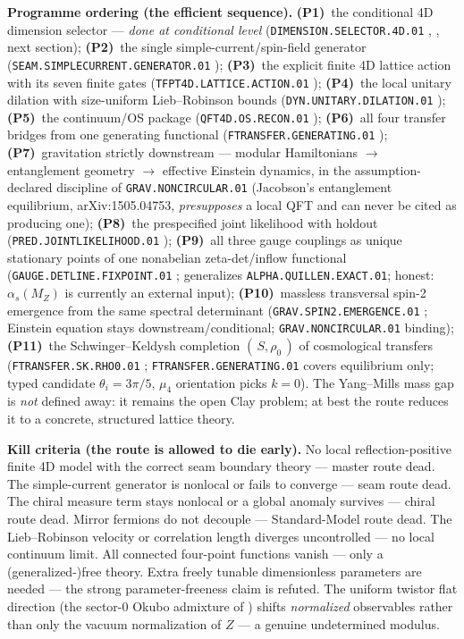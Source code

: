 \par\smallskip\noindent\textbf{Programme ordering (the efficient sequence).}
\textbf{(P1)}~the conditional 4D dimension selector --- \emph{done at conditional level}
(\texttt{DIMENSION.SELECTOR.4D.01} \mC, , next section);
\textbf{(P2)}~the single simple-current/spin-field generator
(\texttt{SEAM.SIMPLECURRENT.GENERATOR.01} \mO);
\textbf{(P3)}~the explicit finite 4D lattice action with its seven finite gates
(\texttt{TFPT4D.LATTICE.ACTION.01} \mO);
\textbf{(P4)}~the local unitary dilation with size-uniform Lieb--Robinson bounds
(\texttt{DYN.UNITARY.DILATION.01} \mO);
\textbf{(P5)}~the continuum/OS package (\texttt{QFT4D.OS.RECON.01} \mO);
\textbf{(P6)}~all four transfer bridges from one generating functional
(\texttt{FTRANSFER.GENERATING.01} \mO);
\textbf{(P7)}~gravitation strictly downstream --- modular Hamiltonians $\to$ entanglement
geometry $\to$ effective Einstein dynamics, in the assumption-declared discipline of
\texttt{GRAV.NONCIRCULAR.01} (Jacobson's entanglement equilibrium, arXiv:1505.04753,
\emph{presupposes} a local QFT and can never be cited as producing one);
\textbf{(P8)}~the prespecified joint likelihood with holdout
(\texttt{PRED.JOINTLIKELIHOOD.01} \mO);
\textbf{(P9)}~all three gauge couplings as unique stationary points of one nonabelian
zeta-det/inflow functional (\texttt{GAUGE.DETLINE.FIXPOINT.01} \mO; generalizes
\texttt{ALPHA.QUILLEN.EXACT.01}; honest: $\alpha_s(M_Z)$ is currently an external input);
\textbf{(P10)}~massless transversal spin-2 emergence from the same spectral determinant
(\texttt{GRAV.SPIN2.EMERGENCE.01} \mO; Einstein equation stays downstream/conditional;
\texttt{GRAV.NONCIRCULAR.01} binding);
\textbf{(P11)}~the Schwinger--Keldysh completion $(\,S,\rho_0\,)$ of cosmological transfers
(\texttt{FTRANSFER.SK.RHO0.01} \mO; \texttt{FTRANSFER.GENERATING.01} covers equilibrium only;
typed candidate $\theta_i=3\pi/5$, $\mu_4$ orientation picks $k=0$).
The Yang--Mills mass gap is \emph{not} defined away: it remains the open Clay problem; at best
the route reduces it to a concrete, structured lattice theory.

\par\smallskip\noindent\textbf{Kill criteria (the route is allowed to die early).}
No local reflection-positive finite 4D model with the correct seam boundary theory --- master
route dead.  The simple-current generator is nonlocal or fails to converge --- seam route dead.
The chiral measure term stays nonlocal or a global anomaly survives --- chiral route dead.
Mirror fermions do not decouple --- Standard-Model route dead.  The Lieb--Robinson velocity or
correlation length diverges uncontrolled --- no local continuum limit.  All connected four-point
functions vanish --- only a (generalized-)free theory.  Extra freely tunable dimensionless
parameters are needed --- the strong parameter-freeness claim is refuted.  The uniform twistor
flat direction (the sector-0 Okubo admixture of ) shifts
\emph{normalized} observables rather than only the vacuum normalization of $Z$ --- a genuine
undetermined modulus.



